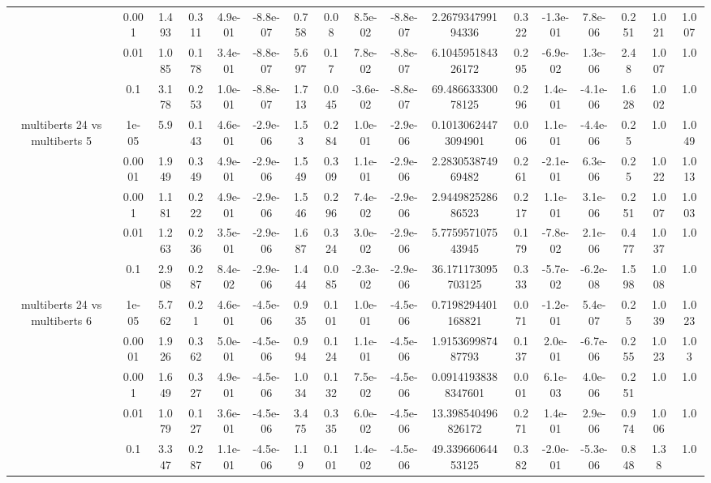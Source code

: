 \begin{tabular}{|c|c|c|c|c|c|c|c|c|c|c|c|c|c|c|c|c|}
 & 0.001 & 1.493 & 0.311 & 4.9e-01 & -8.8e-07 & 0.758 & 0.08 & 8.5e-02 & -8.8e-07 & 2.267934799194336 & 0.322 & -1.3e-01 & 7.8e-06 & 0.251 & 1.021 & 1.007 \\
 & 0.01 & 1.085 & 0.178 & 3.4e-01 & -8.8e-07 & 5.697 & 0.17 & 7.8e-02 & -8.8e-07 & 6.104595184326172 & 0.295 & -6.9e-02 & 1.3e-06 & 2.48 & 1.007 & 1.0 \\
 & 0.1 & 3.178 & 0.253 & 1.0e-01 & -8.8e-07 & 1.713 & 0.045 & -3.6e-02 & -8.8e-07 & 69.48663330078125 & 0.296 & 1.4e-01 & -4.1e-06 & 1.628 & 1.002 & 1.0 \\
\hline
\multirow{5}{*}{multiberts 24 vs multiberts 5} & 1e-05 & 5.9 & 0.143 & 4.6e-01 & -2.9e-06 & 1.53 & 0.284 & 1.0e-01 & -2.9e-06 & 0.10130624473094901 & 0.006 & 1.1e-01 & -4.4e-06 & 0.25 & 1.0 & 1.049 \\
 & 0.0001 & 1.949 & 0.349 & 4.9e-01 & -2.9e-06 & 1.549 & 0.309 & 1.1e-01 & -2.9e-06 & 2.283053874969482 & 0.261 & -2.1e-01 & 6.3e-06 & 0.25 & 1.022 & 1.013 \\
 & 0.001 & 1.181 & 0.222 & 4.9e-01 & -2.9e-06 & 1.546 & 0.296 & 7.4e-02 & -2.9e-06 & 2.944982528686523 & 0.217 & 1.1e-01 & 3.1e-06 & 0.251 & 1.007 & 1.003 \\
 & 0.01 & 1.263 & 0.236 & 3.5e-01 & -2.9e-06 & 1.687 & 0.324 & 3.0e-02 & -2.9e-06 & 5.775957107543945 & 0.179 & -7.8e-02 & 2.1e-06 & 0.477 & 1.037 & 1.0 \\
 & 0.1 & 2.908 & 0.287 & 8.4e-02 & -2.9e-06 & 1.444 & 0.085 & -2.3e-02 & -2.9e-06 & 36.171173095703125 & 0.333 & -5.7e-02 & -6.2e-08 & 1.598 & 1.008 & 1.0 \\
\hline
\multirow{5}{*}{multiberts 24 vs multiberts 6} & 1e-05 & 5.762 & 0.21 & 4.6e-01 & -4.5e-06 & 0.935 & 0.101 & 1.0e-01 & -4.5e-06 & 0.7198294401168821 & 0.071 & -1.2e-01 & 5.4e-07 & 0.25 & 1.039 & 1.023 \\
 & 0.0001 & 1.926 & 0.362 & 5.0e-01 & -4.5e-06 & 0.994 & 0.124 & 1.1e-01 & -4.5e-06 & 1.915369987487793 & 0.137 & 2.0e-01 & -6.7e-06 & 0.255 & 1.023 & 1.03 \\
 & 0.001 & 1.649 & 0.327 & 4.9e-01 & -4.5e-06 & 1.034 & 0.132 & 7.5e-02 & -4.5e-06 & 0.09141938388347601 & 0.001 & 6.1e-03 & 4.0e-06 & 0.251 & 1.0 & 1.0 \\
 & 0.01 & 1.079 & 0.127 & 3.6e-01 & -4.5e-06 & 3.475 & 0.335 & 6.0e-02 & -4.5e-06 & 13.398540496826172 & 0.271 & 1.4e-01 & 2.9e-06 & 0.974 & 1.006 & 1.0 \\
 & 0.1 & 3.347 & 0.287 & 1.1e-01 & -4.5e-06 & 1.19 & 0.101 & 1.4e-02 & -4.5e-06 & 49.33966064453125 & 0.382 & -2.0e-01 & -5.3e-06 & 0.848 & 1.38 & 1.0 \\

\end{tabular}
